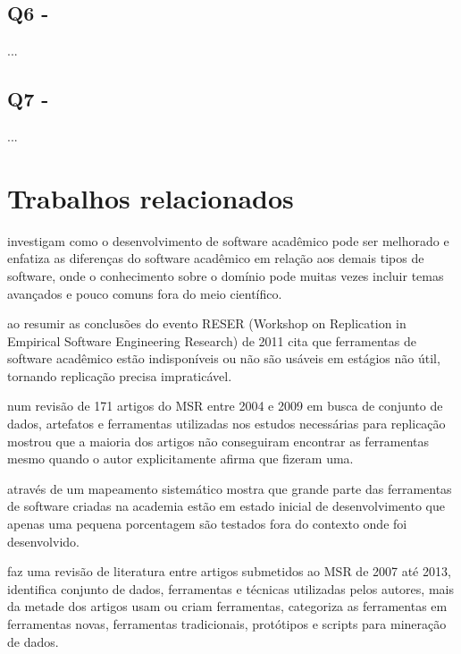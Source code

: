 \subsection{Q6 - \QuestaoSeis} %

...

\subsection{Q7 - \QuestaoSete} %

...

\section{Trabalhos relacionados}

investigam como o desenvolvimento de software acadêmico pode ser melhorado e
enfatiza as diferenças do software acadêmico em relação aos demais tipos de
software, onde o conhecimento sobre o domínio pode muitas vezes incluir temas
avançados e pouco comuns fora do meio científico.

ao resumir as conclusões do evento RESER (Workshop on Replication in Empirical
Software Engineering Research) de 2011 cita que ferramentas de software
acadêmico estão indisponíveis ou não são usáveis em estágios não útil, tornando
replicação precisa impraticável.

 num revisão de 171 artigos do MSR entre 2004 e 2009
em busca de conjunto de dados, artefatos e ferramentas utilizadas nos estudos
necessárias para replicação mostrou que a maioria dos artigos não conseguiram encontrar
as ferramentas mesmo quando o autor explicitamente afirma que fizeram uma.


através de um mapeamento sistemático mostra que grande parte das ferramentas de
software criadas na academia estão em estado inicial de desenvolvimento que
apenas uma pequena porcentagem são testados fora do contexto onde foi
desenvolvido. 

faz uma revisão de literatura entre artigos submetidos ao MSR de 2007 até 2013,
identifica conjunto de dados, ferramentas e técnicas utilizadas pelos autores,
mais da metade dos artigos usam ou criam ferramentas, categoriza as ferramentas
em ferramentas novas, ferramentas tradicionais, protótipos e scripts para
mineração de dados.

